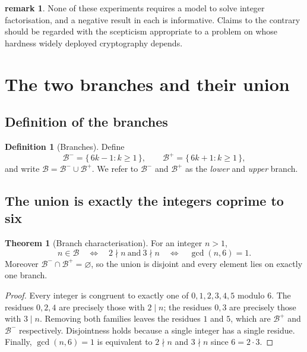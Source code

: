 \documentclass[11pt]{article}
\theoremstyle{definition}
\newtheorem{definition}{Definition}
\newtheorem{theorem}{Theorem}
\newtheorem{remark}{remark}
\begin{document}
\begin{remark}
None of these experiments requires a model to solve integer factorisation, and
a negative result in each is informative. Claims to the contrary should be
regarded with the scepticism appropriate to a problem on whose hardness
widely deployed cryptography depends.
\end{remark}

\section{The two branches and their union}

\subsection{Definition of the branches}

\begin{definition}[Branches]
Define
\[
  \mathcal{B}^- = \{\,6k-1 : k \ge 1 \,\}, \qquad
  \mathcal{B}^+ = \{\,6k+1 : k \ge 1 \,\},
\]
and write $\mathcal{B} = \mathcal{B}^- \cup \mathcal{B}^+$. We refer to
$\mathcal{B}^-$ and $\mathcal{B}^+$ as the \emph{lower} and \emph{upper}
branch.
\end{definition}

\subsection{The union is exactly the integers coprime to six}

\begin{theorem}[Branch characterisation]\label{thm:branches}
For an integer $n > 1$,
\[
  n \in \mathcal{B}
  \quad\Longleftrightarrow\quad
  2 \nmid n \ \text{and}\ 3 \nmid n
  \quad\Longleftrightarrow\quad
  \gcd(n,6) = 1 .
\]
Moreover $\mathcal{B}^- \cap \mathcal{B}^+ = \varnothing$, so the union is
disjoint and every element lies on exactly one branch.
\end{theorem}

\begin{proof}
Every integer is congruent to exactly one of $0,1,2,3,4,5$ modulo $6$. The
residues $0,2,4$ are precisely those with $2 \mid n$; the residues $0,3$ are
precisely those with $3 \mid n$. Removing both families leaves the residues
$1$ and $5$, which are $\mathcal{B}^+$ and $\mathcal{B}^-$ respectively.
Disjointness holds because a single integer has a single residue. Finally,
$\gcd(n,6)=1$ is equivalent to $2 \nmid n$ and $3 \nmid n$ since
$6 = 2 \cdot 3$.
\end{proof}
\end{document}

